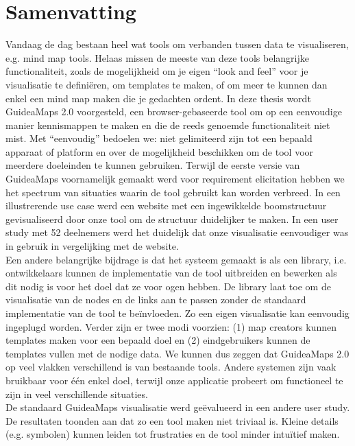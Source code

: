 \section*{Samenvatting}\enlargethispage{1.5\baselineskip}

Vandaag de dag bestaan heel wat tools om verbanden tussen data te visualiseren, e.g. mind map tools. Helaas missen de meeste van deze tools belangrijke functionaliteit, zoals de mogelijkheid om je eigen ``look and feel'' voor je visualisatie te defini\"eren, om templates te maken, of om meer te kunnen dan enkel een mind map maken die je gedachten ordent. In deze thesis wordt GuideaMaps 2.0 voorgesteld, een browser-gebaseerde tool om op een eenvoudige manier kennismappen te maken en die de reeds genoemde functionaliteit niet mist. Met ``eenvoudig'' bedoelen we: niet gelimiteerd zijn tot een bepaald apparaat of platform en over de mogelijkheid beschikken om de tool voor meerdere doeleinden te kunnen gebruiken. Terwijl de eerste versie van GuideaMaps voornamelijk gemaakt werd voor requirement elicitation hebben we het spectrum van situaties waarin de tool gebruikt kan worden verbreed. In een illustrerende use case werd een website met een ingewikkelde boomstructuur gevisualiseerd door onze tool om de structuur duidelijker te maken. In een user study met 52 deelnemers werd het duidelijk dat onze visualisatie eenvoudiger was in gebruik in vergelijking met de website.\\

Een andere belangrijke bijdrage is dat het systeem gemaakt is als een library, i.e. ontwikkelaars kunnen de implementatie van de tool uitbreiden en bewerken als dit nodig is voor het doel dat ze voor ogen hebben. De library laat toe om de visualisatie van de nodes en de links aan te passen zonder de standaard implementatie van de tool te be\"invloeden. Zo een eigen visualisatie kan eenvoudig ingeplugd worden. Verder zijn er twee modi voorzien: (1) map creators kunnen templates maken voor een bepaald doel en (2) eindgebruikers kunnen de templates vullen met de nodige data. We kunnen dus zeggen dat GuideaMaps 2.0 op veel vlakken verschillend is van bestaande tools. Andere systemen zijn vaak bruikbaar voor \'e\'en enkel doel, terwijl onze applicatie probeert om functioneel te zijn in veel verschillende situaties.\\

De standaard GuideaMaps visualisatie werd ge\"evalueerd in een andere user study. De resultaten toonden aan dat zo een tool maken niet triviaal is. Kleine details (e.g. symbolen) kunnen leiden tot frustraties en de tool minder intu\"itief maken.